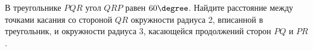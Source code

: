 \begin{ex}
	\begin{condition}
		В треугольнике \( PQR  \) угол \( QRP  \) равен \( 60\degree \). Найдите расстояние между точками касания со стороной \( QR  \) окружности радиуса 2, вписанной в треугольник, и окружности радиуса \( 3 \), касающейся продолжений сторон \( PQ  \) и \( PR \).
	\end{condition}
\end{ex}